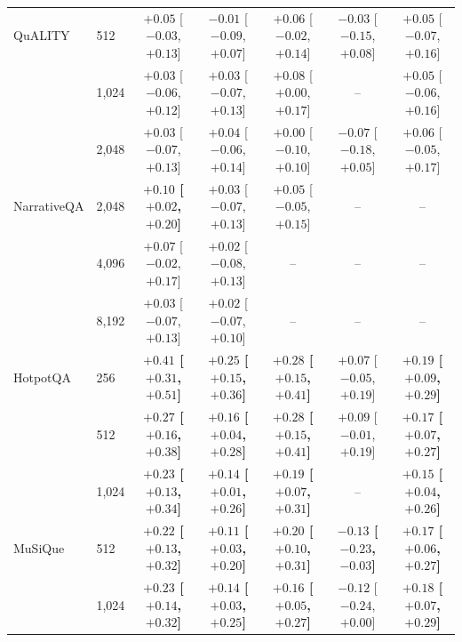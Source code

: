 \begin{tabular}{llccccc}
\midrule
QuALITY & 512 & $+0.05$ \scriptsize[$-0.03$, $+0.13$] & $-0.01$ \scriptsize[$-0.09$, $+0.07$] & $+0.06$ \scriptsize[$-0.02$, $+0.14$] & $-0.03$ \scriptsize[$-0.15$, $+0.08$] & $+0.05$ \scriptsize[$-0.07$, $+0.16$] \\
 & 1,024 & $+0.03$ \scriptsize[$-0.06$, $+0.12$] & $+0.03$ \scriptsize[$-0.07$, $+0.13$] & $+0.08$ \scriptsize[$+0.00$, $+0.17$] & -- & $+0.05$ \scriptsize[$-0.06$, $+0.16$] \\
 & 2,048 & $+0.03$ \scriptsize[$-0.07$, $+0.13$] & $+0.04$ \scriptsize[$-0.06$, $+0.14$] & $+0.00$ \scriptsize[$-0.10$, $+0.10$] & $-0.07$ \scriptsize[$-0.18$, $+0.05$] & $+0.06$ \scriptsize[$-0.05$, $+0.17$] \\
\midrule
NarrativeQA & 2,048 & \textbf{$+0.10$ \scriptsize[$+0.02$, $+0.20$]} & $+0.03$ \scriptsize[$-0.07$, $+0.13$] & $+0.05$ \scriptsize[$-0.05$, $+0.15$] & -- & -- \\
 & 4,096 & $+0.07$ \scriptsize[$-0.02$, $+0.17$] & $+0.02$ \scriptsize[$-0.08$, $+0.13$] & -- & -- & -- \\
 & 8,192 & $+0.03$ \scriptsize[$-0.07$, $+0.13$] & $+0.02$ \scriptsize[$-0.07$, $+0.10$] & -- & -- & -- \\
\midrule
HotpotQA & 256 & \textbf{$+0.41$ \scriptsize[$+0.31$, $+0.51$]} & \textbf{$+0.25$ \scriptsize[$+0.15$, $+0.36$]} & \textbf{$+0.28$ \scriptsize[$+0.15$, $+0.41$]} & $+0.07$ \scriptsize[$-0.05$, $+0.19$] & \textbf{$+0.19$ \scriptsize[$+0.09$, $+0.29$]} \\
 & 512 & \textbf{$+0.27$ \scriptsize[$+0.16$, $+0.38$]} & \textbf{$+0.16$ \scriptsize[$+0.04$, $+0.28$]} & \textbf{$+0.28$ \scriptsize[$+0.15$, $+0.41$]} & $+0.09$ \scriptsize[$-0.01$, $+0.19$] & \textbf{$+0.17$ \scriptsize[$+0.07$, $+0.27$]} \\
 & 1,024 & \textbf{$+0.23$ \scriptsize[$+0.13$, $+0.34$]} & \textbf{$+0.14$ \scriptsize[$+0.01$, $+0.26$]} & \textbf{$+0.19$ \scriptsize[$+0.07$, $+0.31$]} & -- & \textbf{$+0.15$ \scriptsize[$+0.04$, $+0.26$]} \\
\midrule
MuSiQue & 512 & \textbf{$+0.22$ \scriptsize[$+0.13$, $+0.32$]} & \textbf{$+0.11$ \scriptsize[$+0.03$, $+0.20$]} & \textbf{$+0.20$ \scriptsize[$+0.10$, $+0.31$]} & \textbf{$-0.13$ \scriptsize[$-0.23$, $-0.03$]} & \textbf{$+0.17$ \scriptsize[$+0.06$, $+0.27$]} \\
 & 1,024 & \textbf{$+0.23$ \scriptsize[$+0.14$, $+0.32$]} & \textbf{$+0.14$ \scriptsize[$+0.03$, $+0.25$]} & \textbf{$+0.16$ \scriptsize[$+0.05$, $+0.27$]} & $-0.12$ \scriptsize[$-0.24$, $+0.00$] & \textbf{$+0.18$ \scriptsize[$+0.07$, $+0.29$]} \\

\end{tabular}
